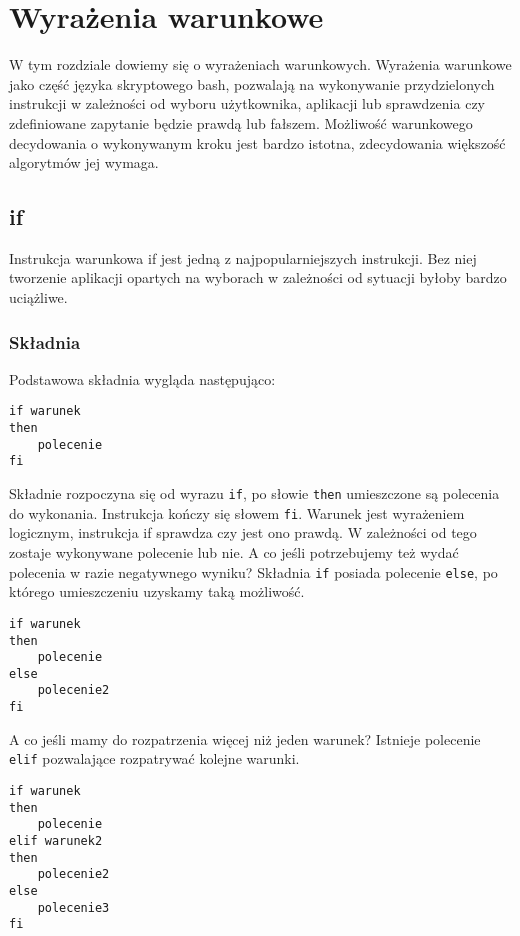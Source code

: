 \chapter{Wyrażenia warunkowe}
W tym rozdziale dowiemy się o wyrażeniach warunkowych. Wyrażenia warunkowe jako część języka skryptowego bash, pozwalają na wykonywanie przydzielonych instrukcji w zależności od wyboru użytkownika, aplikacji lub sprawdzenia czy zdefiniowane zapytanie będzie prawdą lub fałszem. Możliwość warunkowego decydowania o wykonywanym kroku jest bardzo istotna, zdecydowania większość algorytmów jej wymaga.
\section{if}
Instrukcja warunkowa if jest jedną z najpopularniejszych instrukcji. Bez niej tworzenie aplikacji opartych na wyborach w zależności od sytuacji byłoby bardzo uciążliwe.
\subsection{Składnia}
Podstawowa składnia wygląda następująco:
\begin{lstlisting}
if warunek
then
	polecenie
fi
\end{lstlisting}
Składnie rozpoczyna się od wyrazu \texttt{if}, po słowie \texttt{then} umieszczone są polecenia do wykonania. Instrukcja kończy się słowem \texttt{fi}. Warunek jest wyrażeniem logicznym, instrukcja if sprawdza czy jest ono prawdą. W zależności od tego zostaje wykonywane polecenie lub nie.\newline
A co jeśli potrzebujemy też wydać polecenia w razie negatywnego wyniku? Składnia \texttt{if} posiada polecenie \texttt{else}, po którego umieszczeniu uzyskamy taką możliwość.
\begin{lstlisting}
if warunek
then
	polecenie
else
	polecenie2
fi
\end{lstlisting}
A co jeśli mamy do rozpatrzenia więcej niż jeden warunek? Istnieje polecenie \texttt{elif} pozwalające rozpatrywać kolejne warunki.
\begin{lstlisting}
if warunek
then
	polecenie
elif warunek2
then
	polecenie2
else
	polecenie3
fi
\end{lstlisting}

